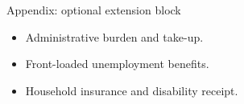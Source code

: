 \documentclass[aspectratio=169,11pt]{beamer}
\begin{document}
\appendix

\begin{frame}{Appendix: optional extension block}
\begin{itemize}
    \item Administrative burden and take-up.
    \item Front-loaded unemployment benefits.
    \item Household insurance and disability receipt.
\end{itemize}
\end{frame}
\end{document}
